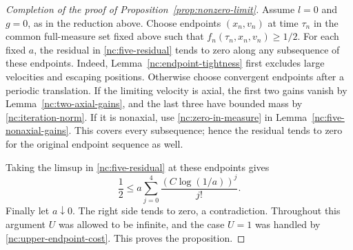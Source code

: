 \begin{proof}[Completion of the proof of Proposition~\ref{prop:nonzero-limit}]
Assume \(l=0\) and \(g=0\), as in the reduction above.
Choose endpoints \((x_n,v_n)\) at time \(\tau_n\) in the common
full-measure set fixed above such that \(f_n(\tau_n,x_n,v_n)\ge1/2\).
For each fixed \(a\), the residual in
\eqref{nc:five-residual} tends to zero along any subsequence
of these endpoints.  Indeed, Lemma~\ref{nc:endpoint-tightness}
first excludes large velocities and escaping positions.
Otherwise choose convergent endpoints after a periodic
translation.  If the limiting velocity is axial, the first
two gains vanish by Lemma~\ref{nc:two-axial-gains}, and the
last three have bounded mass by \eqref{nc:iteration-norm}.
If it is nonaxial, use \eqref{nc:zero-in-measure} in
Lemma~\ref{nc:five-nonaxial-gains}.  This covers every
subsequence; hence the residual tends to zero for the
original endpoint sequence as well.

Taking the limsup in \eqref{nc:five-residual} at these
endpoints gives
\[
 \frac12
 \le a\sum_{j=0}^4\frac{(C\log(1/a))^j}{j!}.
\]
Finally let \(a\downarrow0\).  The right side tends to zero,
a contradiction.  Throughout this argument \(U\) was allowed
to be infinite, and the case \(U=1\) was handled by
\eqref{nc:upper-endpoint-cost}.  This proves the proposition.
\end{proof}
